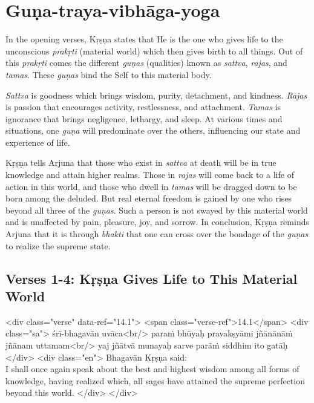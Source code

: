 \chapter{Guṇa-traya-vibhāga-yoga}\label{chap-guna-traya-vibhaga-yoga}

\noindent In the opening verses, Kṛṣṇa states that He is the one who gives life to the unconscious \textit{prakṛti} (material world) which then gives birth to all things. Out of this \textit{prakṛti} comes the different \textit{guṇas} (qualities) known as \textit{sattva}, \textit{rajas}, and \textit{tamas}. These \textit{guṇas} bind the Self to this material body.

\textit{Sattva} is goodness which brings wisdom, purity, detachment, and kindness. \textit{Rajas} is passion that encourages activity, restlessness, and attachment. \textit{Tamas} is ignorance that brings negligence, lethargy, and sleep. At various times and situations, one \textit{guṇa} will predominate over the others, influencing our state and experience of life.

Kṛṣṇa tells Arjuna that those who exist in \textit{sattva} at death will be in true knowledge and attain higher realms. Those in \textit{rajas} will come back to a life of action in this world, and those who dwell in \textit{tamas} will be dragged down to be born among the deluded. But real eternal freedom is gained by one who rises beyond all three of the \textit{guṇas}. Such a person is not swayed by this material world and is unaffected by pain, pleasure, joy, and sorrow. In conclusion, Kṛṣṇa reminds Arjuna that it is through \textit{bhakti} that one can cross over the bondage of the \textit{guṇas} to realize the supreme state.

\section{Verses 1-4: Kṛṣṇa Gives Life to This Material World}\label{sec-verses-1-4-krsna-gives-life-to-this-material-world}



\begin{html}
<div class="verse" data-ref="14.1">
  <span class="verse-ref">14.1</span>
  <div class="sa">
    śrī-bhagavān uvāca<br/>
    paraṁ bhūyaḥ pravakṣyāmi jñānānāṁ jñānam uttamam<br/>
    yaj jñātvā munayaḥ sarve parāṁ siddhim ito gatāḥ
  </div>
  <div class="en">
    \hspace*{1em}Bhagavān Kṛṣṇa said: \\ I shall once again speak about the best and highest wisdom among all forms of knowledge, having realized which, all sages have attained the supreme perfection beyond this world.
  </div>
</div>
\end{html}



